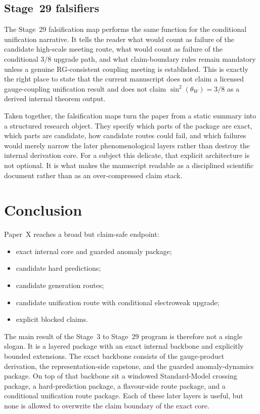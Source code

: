\documentclass[11pt]{article}
\begin{document}
\subsection{Stage~29 falsifiers}
The Stage~29 falsification map performs the same function for the conditional unification narrative. It tells the reader what would count as failure of the candidate high-scale meeting route, what would count as failure of the conditional $3/8$ upgrade path, and what claim-boundary rules remain mandatory unless a genuine RG-consistent coupling meeting is established. This is exactly the right place to state that the current manuscript does not claim a licensed gauge-coupling unification result and does not claim $\sin^2(\theta_W)=3/8$ as a derived internal theorem output.

Taken together, the falsification maps turn the paper from a static summary into a structured research object. They specify which parts of the package are exact, which parts are candidate, how candidate routes could fail, and which failures would merely narrow the later phenomenological layers rather than destroy the internal derivation core. For a subject this delicate, that explicit architecture is not optional. It is what makes the manuscript readable as a disciplined scientific document rather than as an over-compressed claim stack.

\section{Conclusion}
Paper~X reaches a broad but claim-safe endpoint:
\begin{itemize}
    \item exact internal core and guarded anomaly package;
    \item candidate hard predictions;
    \item candidate generation routes;
    \item candidate unification route with conditional electroweak upgrade;
    \item explicit blocked claims.
\end{itemize}
The main result of the Stage~3 to Stage~29 program is therefore not a single slogan. It is a layered package with an exact internal backbone and explicitly bounded extensions. The exact backbone consists of the gauge-product derivation, the representation-side capstone, and the guarded anomaly-dynamics package. On top of that backbone sit a windowed Standard-Model crossing package, a hard-prediction package, a flavour-side route package, and a conditional unification route package. Each of these later layers is useful, but none is allowed to overwrite the claim boundary of the exact core.
\end{document}
